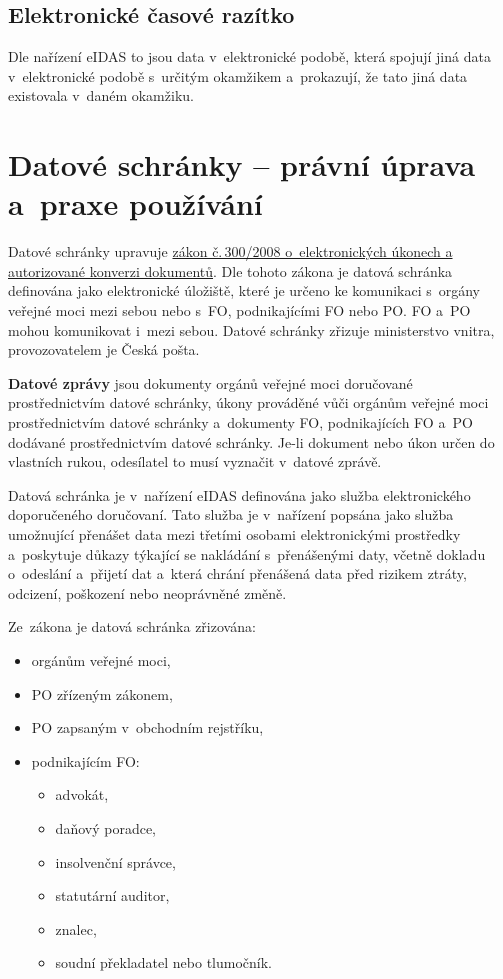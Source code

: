 \subsection{Elektronické časové razítko} Dle nařízení eIDAS to jsou data v~elektronické podobě, která spojují jiná data v~elektronické podobě s~určitým okamžikem a~prokazují, že tato jiná data existovala v~daném okamžiku.







\clearpage
\section{Datové schránky -- právní úprava a~praxe používání}

Datové schránky upravuje \href{https://www.zakonyprolidi.cz/cs/2008-300}{zákon č.\,300/2008 o~elektronických úkonech a autorizované konverzi dokumentů}. Dle tohoto zákona je datová schránka definována jako elektronické úložiště, které je určeno ke komunikaci s~orgány veřejné moci mezi sebou nebo s~FO, podnikajícími FO nebo PO. FO a~PO mohou komunikovat i~mezi sebou. Datové schránky zřizuje ministerstvo vnitra, provozovatelem je Česká pošta.

\textbf{Datové zprávy} jsou dokumenty orgánů veřejné moci doručované prostřednictvím datové schránky, úkony prováděné vůči orgánům veřejné moci prostřednictvím datové schránky a~dokumenty FO, podnikajících FO a~PO dodávané prostřednictvím datové schránky. Je-li dokument nebo úkon určen do vlastních rukou, odesílatel to musí vyznačit v~datové zprávě.

Datová schránka je v~nařízení eIDAS definována jako služba elektronického doporučeného doručovaní. Tato služba je v~nařízení popsána jako služba umožnující přenášet data mezi třetími osobami elektronickými prostředky a~poskytuje důkazy týkající se nakládání s~přenášenými daty, včetně dokladu o~odeslání a~přijetí dat a~která chrání přenášená data před rizikem ztráty, odcizení, poškození nebo neoprávněné změně.

Ze~zákona je datová schránka zřizována:

\begin{itemize}
    \item orgánům veřejné moci,
    \item PO zřízeným zákonem,
    \item PO zapsaným v~obchodním rejstříku,
    \item podnikajícím FO:
          \begin{itemize}
              \item advokát,
              \item daňový poradce,
              \item insolvenční správce,
              \item statutární auditor,
              \item znalec,
              \item soudní překladatel nebo tlumočník.
          \end{itemize}
\end{itemize}

